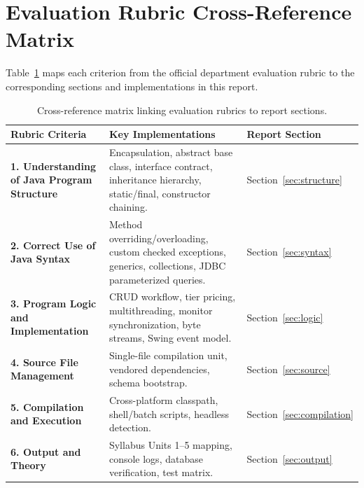 \documentclass[11pt,a4paper]{article}
\begin{document}
\newpage
\tableofcontents
\newpage

\section*{Evaluation Rubric Cross-Reference Matrix}

Table~\ref{tab:rubric_mapping} maps each criterion from the official department evaluation rubric to the corresponding sections and implementations in this report.

\begin{table}[h!]
\centering
\small
\begin{tabularx}{\textwidth}{p{3.8cm} p{6.2cm} p{3.8cm}}
\toprule
\textbf{Rubric Criteria} & \textbf{Key Implementations} & \textbf{Report Section} \\
\midrule
\textbf{1. Understanding of Java Program Structure} & Encapsulation, abstract base class, interface contract, inheritance hierarchy, static/final, constructor chaining. & Section~\ref{sec:structure} \\
\addlinespace
\textbf{2. Correct Use of Java Syntax} & Method overriding/overloading, custom checked exceptions, generics, collections, JDBC parameterized queries. & Section~\ref{sec:syntax} \\
\addlinespace
\textbf{3. Program Logic and Implementation} & CRUD workflow, tier pricing, multithreading, monitor synchronization, byte streams, Swing event model. & Section~\ref{sec:logic} \\
\addlinespace
\textbf{4. Source File Management} & Single-file compilation unit, vendored dependencies, schema bootstrap. & Section~\ref{sec:source} \\
\addlinespace
\textbf{5. Compilation and Execution} & Cross-platform classpath, shell/batch scripts, headless detection. & Section~\ref{sec:compilation} \\
\addlinespace
\textbf{6. Output and Theory} & Syllabus Units 1--5 mapping, console logs, database verification, test matrix. & Section~\ref{sec:output} \\
\bottomrule
\end{tabularx}
\caption{Cross-reference matrix linking evaluation rubrics to report sections.}
\label{tab:rubric_mapping}
\end{table}
\end{document}
